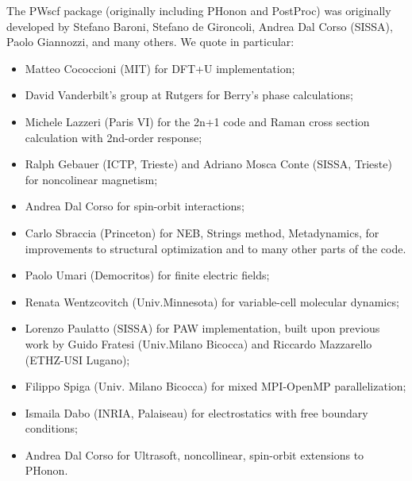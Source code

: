 \documentclass[12pt,a4paper]{article}
\begin{document}
The PWscf package (originally including PHonon and PostProc)
was originally developed by Stefano Baroni, Stefano
de Gironcoli, Andrea Dal Corso (SISSA), Paolo Giannozzi, and many others.
We quote in particular:
\begin{itemize}
  \item Matteo Cococcioni (MIT) for DFT+U implementation;
  \item David Vanderbilt's group at Rutgers for Berry's phase
  calculations;
  \item Michele Lazzeri (Paris VI) for the 2n+1 code and Raman 
  cross section calculation with 2nd-order response;
  \item Ralph Gebauer (ICTP, Trieste) and Adriano Mosca Conte
  (SISSA, Trieste) for noncolinear magnetism;
  \item Andrea Dal Corso for spin-orbit interactions;
  \item Carlo Sbraccia (Princeton) for NEB, Strings method,
  Metadynamics, for improvements to structural optimization
  and to many other parts of the code.
  \item Paolo Umari (Democritos) for finite electric fields;
  \item Renata Wentzcovitch (Univ.Minnesota) for variable-cell
   molecular dynamics;
  \item Lorenzo Paulatto (SISSA) for PAW implementation, built 
  upon previous work by Guido Fratesi (Univ.Milano Bicocca)
  and Riccardo Mazzarello (ETHZ-USI Lugano);
\item Filippo Spiga (Univ. Milano Bicocca) for mixed MPI-OpenMP
 parallelization;
 \item Ismaila Dabo (INRIA, Palaiseau) for electrostatics with
 free boundary conditions;
 \item Andrea Dal Corso for Ultrasoft, noncollinear, spin-orbit
 extensions to PHonon.
\end{itemize}
\end{document}
